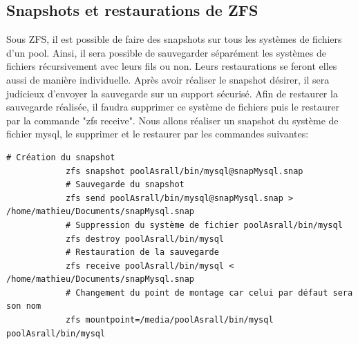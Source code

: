 \documentclass[a4paper]{report}
\begin{document}
		\subsection{Snapshots et restaurations de ZFS}
			Sous ZFS, il est possible de faire des snapshots sur tous les systèmes de fichiers d'un pool. Ainsi, il sera possible de sauvegarder séparément les systèmes de fichiers récursivement avec leurs fils ou non. Leurs restaurations se feront elles aussi de manière individuelle. Après avoir réaliser le snapshot désirer, il sera judicieux d'envoyer la sauvegarde sur un support sécurisé. Afin de restaurer la sauvegarde réalisée, il faudra supprimer ce système de fichiers puis le restaurer par la commande "zfs receive". Nous allons réaliser un snapshot du système de fichier mysql, le supprimer et le restaurer par les commandes suivantes:
		\begin{lstlisting}[language=ksh,texcl]
			# Création du snapshot
			zfs snapshot poolAsrall/bin/mysql@snapMysql.snap
			# Sauvegarde du snapshot
			zfs send poolAsrall/bin/mysql@snapMysql.snap > /home/mathieu/Documents/snapMysql.snap
			# Suppression du système de fichier poolAsrall/bin/mysql
			zfs destroy poolAsrall/bin/mysql
			# Restauration de la sauvegarde
			zfs receive poolAsrall/bin/mysql < /home/mathieu/Documents/snapMysql.snap
			# Changement du point de montage car celui par défaut sera son nom
			zfs mountpoint=/media/poolAsrall/bin/mysql poolAsrall/bin/mysql 
		\end{lstlisting}
		
\end{document}
